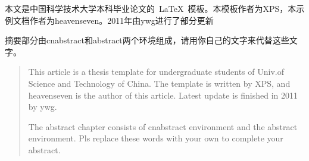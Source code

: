 
\begin{cnabstract}
本文是中国科学技术大学本科毕业论文的~\LaTeX{}~模板。本模板作者为XPS，本示例文档作者为heavenseven。2011年由ywg进行了部分更新

摘要部分由cnabstract和abstract两个环境组成，请用你自己的文字来代替这些文字。
\end{cnabstract}


\begin{abstract}
This article is a thesis template for undergraduate students of Univ.of Science and Technology of China.
The template is written by XPS, and heavenseven is the author of this article. Latest update is finished in 2011 by ywg. 

The abstract chapter consists of cnabstract environment and the abstract environment. Pls replace these words with your own to complete your abstract.
\end{abstract}
